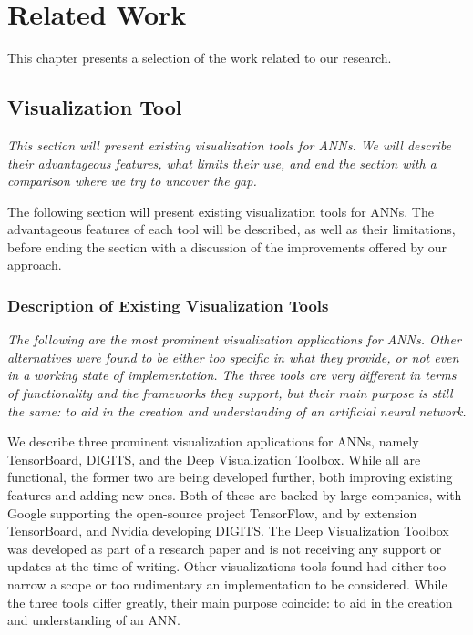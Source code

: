 
\chapter{Related Work}

This chapter presents a selection of the work related to our research.

\section{Visualization Tool}

\textit{This section will present existing visualization tools for ANNs. We will describe their advantageous features, what limits their use, and end the section with a comparison where we try to uncover the gap.} 

The following section will present existing visualization tools for ANNs. The advantageous features of each tool will be described, as well as their limitations, before ending the section with a discussion of the improvements offered by our approach. 

\subsection{Description of Existing Visualization Tools}

\textit{The following are the most prominent visualization applications for ANNs. Other alternatives were found to be either too specific in what they provide, or not even in a working state of implementation. The three tools are very different in terms of functionality and the frameworks they support, but their main purpose is still the same: to aid in the creation and understanding of an artificial neural network.}

We describe three prominent visualization applications for ANNs, namely TensorBoard, DIGITS, and the Deep Visualization Toolbox. While all are functional, the former two are being developed further, both improving existing features and adding new ones. Both of these are backed by large companies, with Google supporting the open-source project TensorFlow, and by extension TensorBoard, and Nvidia developing DIGITS. The Deep Visualization Toolbox was developed as part of a research paper and is not receiving any support or updates at the time of writing. Other visualizations tools found had either too narrow a scope or too rudimentary an implementation to be considered. While the three tools differ greatly, their main purpose coincide: to aid in the creation and understanding of an ANN.


